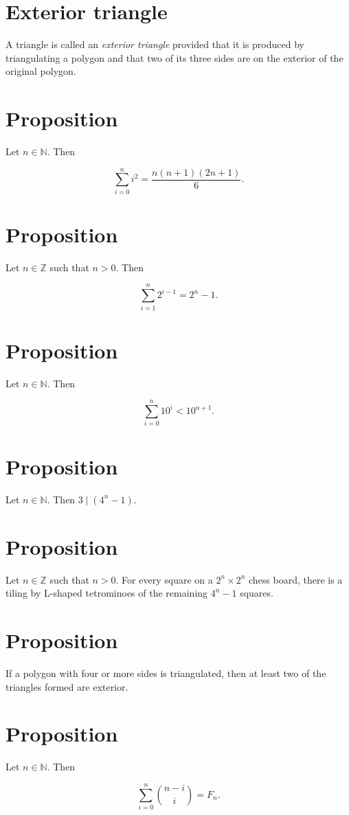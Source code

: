 \documentclass[12pt]{article}
\begin{document}
\section*{Exterior triangle}
A triangle is called an \textit{exterior triangle} provided that it is produced by triangulating a polygon and that two of its three sides are on the exterior of the original polygon.
\section*{Proposition}
Let $n\in\mathbb{N}$. Then

\[\sum_{i=0}^{n}{i^2}=\frac{n(n+1)(2n+1)}{6}.\]
\section*{Proposition}
Let $n\in\mathbb{Z}$ such that $n>0$. Then

\[\sum_{i=1}^{n}{2^{i-1}}=2^n-1.\]
\section*{Proposition}
Let $n\in\mathbb{N}$. Then

\[\sum_{i=0}^{n}{10^i}<10^{n+1}.\]
\section*{Proposition}
Let $n\in\mathbb{N}$. Then $3\mid(4^n-1)$.
\section*{Proposition}
Let $n\in\mathbb{Z}$ such that $n>0$. For every square on a $2^n\times 2^n$ chess board, there is a tiling by L-shaped tetrominoes of the remaining $4^n-1$ squares. 
\section*{Proposition}
If a polygon with four or more sides is triangulated, then at least two of the triangles formed are exterior.
\section*{Proposition}
Let $n\in\mathbb{N}$. Then

\[\sum_{i=0}^{n}\binom{n-i}{i}=F_n.\]
\end{document}
